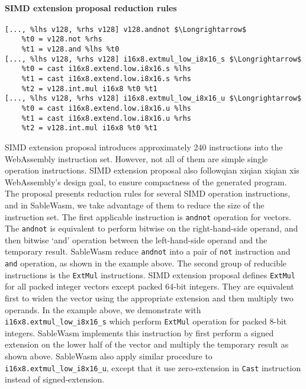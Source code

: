 \paragraph{SIMD extension proposal reduction rules} \quad
\begin{lstlisting}[basicstyle=\linespread{1}\small\ttfamily, language=SableWasmMIR, mathescape=true]
[..., %lhs v128, %rhs v128] v128.andnot $\Longrightarrow$
    %t0 = v128.not %rhs 
    %t1 = v128.and %lhs %t0
[..., %lhs v128, %rhs v128] i16x8.extmul_low_i8x16_s $\Longrightarrow$
    %t0 = cast i16x8.extend.low.i8x16.s %lhs
    %t1 = cast i16x8.extend.low.i8x16.s %rhs
    %t2 = v128.int.mul i16x8 %t0 %t1
[..., %lhs v128, %rhs v128] i16x8.extmul_low_i8x16_u $\Longrightarrow$
    %t0 = cast i16x8.extend.low.i8x16.u %lhs
    %t1 = cast i16x8.extend.low.i8x16.u %rhs
    %t2 = v128.int.mul i16x8 %t0 %t1
\end{lstlisting}
SIMD extension proposal introduces approximately 240 instructions into the WebAssembly instruction set. However, not all of them are simple single operation instructions. SIMD extension proposal also followqian xiqian xiqian xis WebAssembly's design goal, to ensure compactness of the generated program. The proposal presents reduction rules for several SIMD operation instructions, and in SableWasm, we take advantage of them to reduce the size of the instruction set. The first applicable instruction is \texttt{andnot} operation for vectors. The \texttt{andnot} is equivalent to perform bitwise on the right-hand-side operand, and then bitwise `and' operation between the left-hand-side operand and the temporary result. SableWasm reduce \texttt{andnot} into a pair of \texttt{not} instruction and \texttt{and} operation, as shown in the example above. The second group of reducible instructions is the \texttt{ExtMul} instructions. SIMD extension proposal defines \texttt{ExtMul} for all packed integer vectors except packed 64-bit integers. They are equivalent first to widen the vector using the appropriate extension and then multiply two operands. In the example above, we demonstrate with \texttt{i16x8.extmul\_low\_i8x16\_s} which perform \texttt{ExtMul} operation for packed 8-bit integers. SableWasm implements this instruction by first perform a signed extension on the lower half of the vector and multiply the temporary result as shown above. SableWasm also apply similar procedure to \texttt{i16x8.extmul\_low\_i8x16\_u}, except that it use zero-extension in \texttt{Cast} instruction instead of signed-extension.

